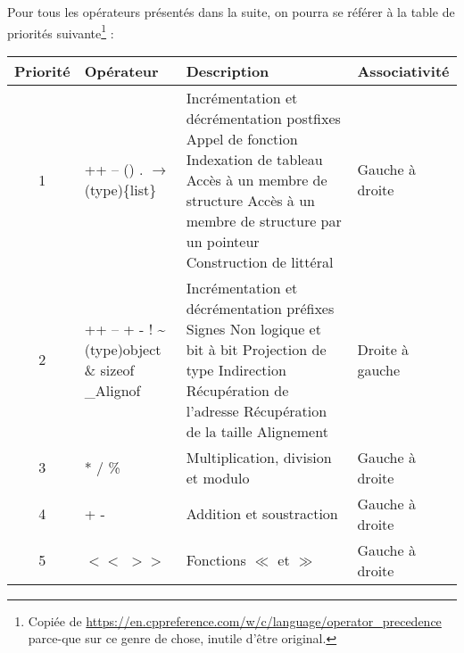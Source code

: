 \documentclass[../../../main.tex]{subfiles}
\begin{document}
Pour tous les opérateurs présentés dans la suite, on pourra se référer à la table de priorités suivante\footnote{Copiée de \url{https://en.cppreference.com/w/c/language/operator_precedence} parce-que sur ce genre de chose, inutile d'être original.} :
\begin{center}
\begin{tabular}{|c|p{}|p{}|l|}
\hline
Priorité & Opérateur & Description & Associativité \\
\hline
1 & ++ -- \newline () \newline [] \newline . \newline $\rightarrow$ \newline (type)\{list\} & Incrémentation et décrémentation postfixes \newline Appel de fonction \newline Indexation de tableau \newline Accès à un membre de structure \newline Accès à un membre de structure par un pointeur \newline Construction de littéral & Gauche à droite\\
\hline
2 & ++ -- \newline + - \newline ! \~ \newline (type)object \newline * \newline \& \newline sizeof \newline \_Alignof & Incrémentation et décrémentation préfixes \newline Signes \newline Non logique et bit à bit \newline Projection de type \newline Indirection \newline Récupération de l'adresse \newline Récupération de la taille \newline Alignement & Droite à gauche \\
\hline
3 & * / \% & Multiplication, division et modulo & Gauche à droite \\
\hline
4 & + - & Addition et soustraction & Gauche à droite \\
\hline
5 & $<<$ $>>$ & Fonctions $\ll$ et $\gg$ & Gauche à droite \\

\end{tabular}
\end{center}
\end{document}
